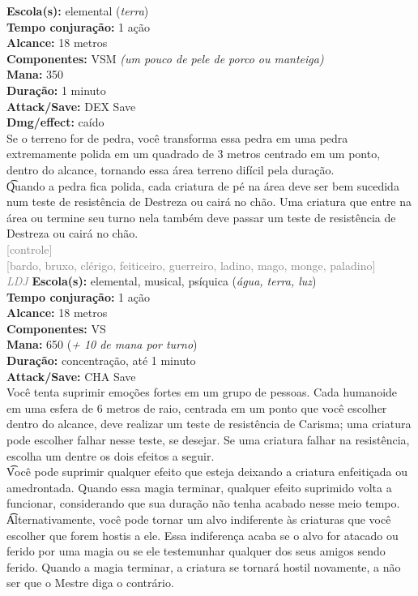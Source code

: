 \documentclass{RPG_Adventure}[2021/10/20]
\begin{document}
{\small \t \textbf{Escola(s):} elemental (\textit{terra})\\\t \textbf{Tempo conjuração:} 1 ação\\\t \textbf{Alcance:} 18 metros\\\t \textbf{Componentes:} VSM \textit{(um pouco de pele de porco ou manteiga)}\\\t \textbf{Mana:} 350\\\t \textbf{Duração:} 1 minuto\\\t \textbf{Attack/Save:} DEX Save\\\t \textbf{Dmg/effect:} caído\\}
{\normalsize Se o terreno for de pedra, você transforma essa pedra em uma pedra extremamente polida em um quadrado de 3 metros centrado em um ponto, dentro do alcance, tornando essa área terreno difícil pela duração.\\\t Quando a pedra fica polida, cada criatura de pé na área deve ser bem sucedida num teste de resistência de Destreza ou cairá no chão. Uma criatura que entre na área ou termine seu turno nela também deve passar um teste de resistência de Destreza ou cairá no chão.\\}
{\scriptsize \textcolor{gray}{[controle]\\}}
{\scriptsize \textcolor{gray}{[bardo, bruxo, clérigo, feiticeiro, guerreiro, ladino, mago, monge, paladino]\\}}
{\tiny \textcolor{gray}{\textit{LDJ}}}
{\small \t \textbf{Escola(s):} elemental, musical, psíquica (\textit{água, terra, luz})\\\t \textbf{Tempo conjuração:} 1 ação\\\t \textbf{Alcance:} 18 metros\\\t \textbf{Componentes:} VS\\\t \textbf{Mana:} 650 (\textit{+ 10 de mana por turno})\\\t \textbf{Duração:} concentração, até 1 minuto\\\t \textbf{Attack/Save:} CHA Save\\}
{\normalsize Você tenta suprimir emoções fortes em um grupo de pessoas. Cada humanoide em uma esfera de 6 metros de raio, centrada em um ponto que você escolher dentro do alcance, deve realizar um teste de resistência de Carisma; uma criatura pode escolher falhar nesse teste, se desejar.  Se uma criatura falhar na resistência, escolha um dentre os dois efeitos a seguir.\\\t Você pode suprimir qualquer efeito que esteja deixando a criatura enfeitiçada ou amedrontada. Quando essa magia terminar, qualquer efeito suprimido volta a funcionar, considerando que sua duração não tenha acabado nesse meio tempo.\\\t Alternativamente, você pode tornar um alvo indiferente às criaturas que você escolher que forem hostis a ele. Essa indiferença acaba se o alvo for atacado ou ferido por uma magia ou se ele testemunhar qualquer dos seus amigos sendo ferido. Quando a magia terminar, a criatura se tornará hostil novamente, a não ser que o Mestre diga o contrário.\\}
\end{document}

